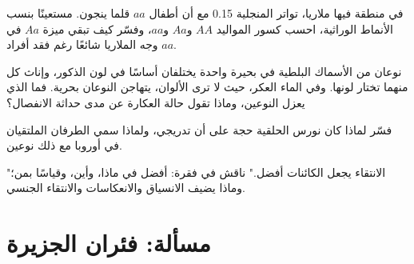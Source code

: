\begin{exercise}[$\star\star\star$]\label{exo:g12:selection-drift-speciation:12}
في منطقة فيها ملاريا، تواتر  المنجلية 0.15 مع أن أطفال $aa$ قلما
ينجون. مستعينًا بنسب الأنماط الوراثية، احسب كسور المواليد $AA$ و$Aa$
و$aa$، وفسّر كيف تبقي ميزة $Aa$ في وجه الملاريا  شائعًا رغم فقد
أفراد $aa$.
\end{exercise}

\begin{exercise}[$\star\star\star$]\label{exo:g12:selection-drift-speciation:13}
نوعان من الأسماك البلطية في بحيرة واحدة يختلفان أساسًا في لون الذكور،
وإناث كل منهما تختار لونها. وفي الماء العكر، حيث لا ترى الألوان،
يتهاجن النوعان بحرية. فما الذي يعزل النوعين، وماذا تقول حالة العكارة
عن مدى حداثة الانفصال؟
\end{exercise}

\begin{exercise}[$\star\star\star$]\label{exo:g12:selection-drift-speciation:14}
فسّر لماذا كان نورس  الحلقية حجة على أن  تدريجي، ولماذا
سمي الطرفان الملتقيان في أوروبا مع ذلك نوعين.
\end{exercise}

\begin{exercise}[$\star\star\star$]\label{exo:g12:selection-drift-speciation:15}
"الانتقاء يجعل الكائنات أفضل." ناقش في فقرة: أفضل في ماذا، وأين،
وقياسًا بمن؛ وماذا يضيف الانسياق والانعكاسات والانتقاء الجنسي.
\end{exercise}

\section{مسألة: فئران الجزيرة}

